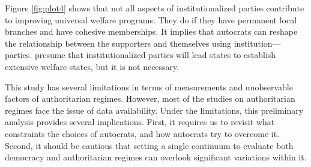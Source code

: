 \documentclass[11pt, notitlepage]{article}
\begin{document}
Figure \ref{fig:plot4} shows that not all aspects of institutionalized parties contribute to improving universal welfare programs. They do if they have permanent local branches and have cohesive memberships. It implies that autocrats can reshape the relationship between the supporters and themselves using institution---parties. \citet{Rasmussen2019} presume that institutionalized parties will lead states to establish extensive welfare states, but it is not necessary.

This study has several limitations in terms of measurements and unobservable factors of authoritarian regimes. However, most of the studies on authoritarian regimes face the issue of data availability. Under the limitations, this preliminary analysis provides several implications. First, it requires us to revisit what constraints the choices of autocrats, and how autocrats try to overcome it. Second, it should be cautious that setting a single continuum to evaluate both democracy and authoritarian regimes can overlook significant variations within it.


\newpage
	
	
\end{document}
